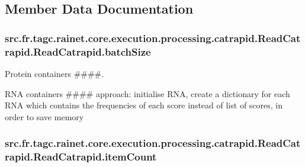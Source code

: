 \subsection{Member Data Documentation}
\hypertarget{classsrc_1_1fr_1_1tagc_1_1rainet_1_1core_1_1execution_1_1processing_1_1catrapid_1_1ReadCatrapid_1_1ReadCatrapid_a48c099718d913970419455c3f1dd6353}{
\subsubsection[{batch\-Size}]{\setlength{\rightskip}{0pt plus 5cm}src.\-fr.\-tagc.\-rainet.\-core.\-execution.\-processing.\-catrapid.\-Read\-Catrapid.\-Read\-Catrapid.\-batch\-Size}}\label{classsrc_1_1fr_1_1tagc_1_1rainet_1_1core_1_1execution_1_1processing_1_1catrapid_1_1ReadCatrapid_1_1ReadCatrapid_a48c099718d913970419455c3f1dd6353}


Protein containers \#\#\#\#. 

R\-N\-A containers \#\#\#\# approach\-: initialise R\-N\-A, create a dictionary for each R\-N\-A which contains the frequencies of each score instead of list of scores, in order to save memory \hypertarget{classsrc_1_1fr_1_1tagc_1_1rainet_1_1core_1_1execution_1_1processing_1_1catrapid_1_1ReadCatrapid_1_1ReadCatrapid_a76bc9a4f154f800618cf4dd27643b207}{
\subsubsection[{item\-Count}]{\setlength{\rightskip}{0pt plus 5cm}src.\-fr.\-tagc.\-rainet.\-core.\-execution.\-processing.\-catrapid.\-Read\-Catrapid.\-Read\-Catrapid.\-item\-Count}}\label{classsrc_1_1fr_1_1tagc_1_1rainet_1_1core_1_1execution_1_1processing_1_1catrapid_1_1ReadCatrapid_1_1ReadCatrapid_a76bc9a4f154f800618cf4dd27643b207}


